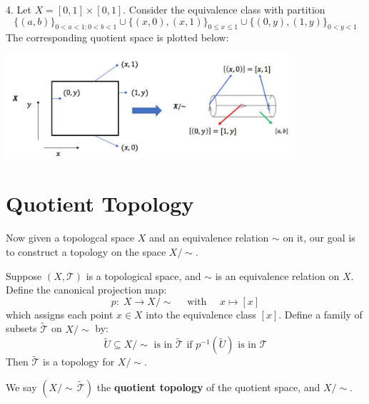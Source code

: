 \begin{example}
4. Let \(X = \left\lbrack  {0,1}\right\rbrack   \times  \left\lbrack  {0,1}\right\rbrack\). Consider the equivalence class with partition
\[
\{ \left( {a,b}\right) {\} }_{0 < a < 1;0 < b < 1} \cup  \{ \left( {x,0}\right),\left( {x,1}\right) {\} }_{0 \leq  x \leq  1} \cup  \{ \left( {0,y}\right),\left( {1,y}\right) {\} }_{0 < y < 1}
\]
The corresponding quotient space is plotted below:
\begin{center}
\includegraphics[width=0.8\textwidth]{images/Ch4_cylinder_glue.jpg}
\end{center}
\end{example}

\section{Quotient Topology}

Now given a topologcal space \(X\) and an equivalence relation \(\sim\) on it, our goal is to construct a topology on the space \(X/ \sim\).

\begin{proposition} \label{prop:quotient_topology} Suppose $(X, \mathcal{T})$ is a topological space, and \(\sim\) is an equivalence relation on \(X\). Define the canonical projection map:
\[
p: \;X \rightarrow  X/ \sim  \quad \text{ with } \quad x \mapsto \left\lbrack  x\right\rbrack   
\]
which assigns each point \(x \in  X\) into the equivalence class \(\left\lbrack  x\right\rbrack\). Define a family of subsets \(\widetilde{\mathcal{T}}\) on \(X/ \sim\) by:
\[
\widetilde{U} \subseteq  X/ \sim  \text{ is in }\widetilde{\mathcal{T}}\text{ if }{p}^{-1}\left( \widetilde{U}\right) \text{ is in }\mathcal{T}
\]
Then \(\widetilde{\mathcal{T}}\) is a topology for \(X/ \sim\).  

We say $(X/\sim\, \widetilde{\mathcal{T}})$ the {\bf quotient topology} of the quotient space, and \(X/ \sim\).
\end{proposition}

